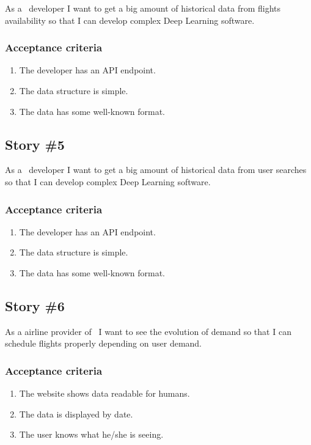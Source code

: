 \begin{displayquote}
As a \company\ developer I want to get a big amount of historical data from flights availability so that I can develop complex Deep Learning software.
\end{displayquote}

\subsubsection*{Acceptance criteria}

\begin{enumerate}
    \item The developer has an API endpoint.
    \item The data structure is simple.
    \item The data has some well-known format.
\end{enumerate}

\subsection*{Story \#5}

\begin{displayquote}
As a \company\ developer I want to get a big amount of historical data from user searches so that I can develop complex Deep Learning software.
\end{displayquote}

\subsubsection*{Acceptance criteria}

\begin{enumerate}
    \item The developer has an API endpoint.
    \item The data structure is simple.
    \item The data has some well-known format.
\end{enumerate}

\subsection*{Story \#6}

\begin{displayquote}
As a airline provider of \company\ I want to see the evolution of demand so that I can schedule flights properly depending on user demand.
\end{displayquote}

\subsubsection*{Acceptance criteria}

\begin{enumerate}
    \item The website shows data readable for humans.
    \item The data is displayed by date.
    \item The user knows what he/she is seeing.
\end{enumerate}


